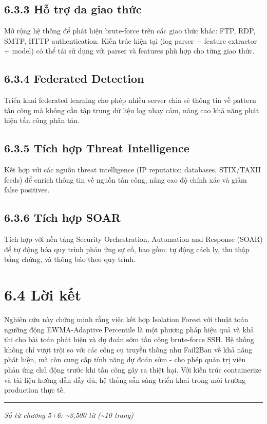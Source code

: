 \documentclass[
  a4paper]{report}
\begin{document}
\subsection{6.3.3 Hỗ trợ đa giao
thức}\label{hux1ed7-trux1ee3-ux111a-giao-thux1ee9c}

Mở rộng hệ thống để phát hiện brute-force trên các giao thức khác: FTP,
RDP, SMTP, HTTP authentication. Kiến trúc hiện tại (log parser + feature
extractor + model) có thể tái sử dụng với parser và features phù hợp cho
từng giao thức.

\subsection{6.3.4 Federated Detection}\label{federated-detection}

Triển khai federated learning cho phép nhiều server chia sẻ thông tin về
pattern tấn công mà không cần tập trung dữ liệu log nhạy cảm, nâng cao
khả năng phát hiện tấn công phân tán.

\subsection{6.3.5 Tích hợp Threat
Intelligence}\label{tuxedch-hux1ee3p-threat-intelligence}

Kết hợp với các nguồn threat intelligence (IP reputation databases,
STIX/TAXII feeds) để enrich thông tin về nguồn tấn công, nâng cao độ
chính xác và giảm false positives.

\subsection{6.3.6 Tích hợp SOAR}\label{tuxedch-hux1ee3p-soar}

Tích hợp với nền tảng Security Orchestration, Automation and Response
(SOAR) để tự động hóa quy trình phản ứng sự cố, bao gồm: tự động cách
ly, thu thập bằng chứng, và thông báo theo quy trình.

\section{6.4 Lời kết}\label{lux1eddi-kux1ebft}

Nghiên cứu này chứng minh rằng việc kết hợp Isolation Forest với thuật
toán ngưỡng động EWMA-Adaptive Percentile là một phương pháp hiệu quả và
khả thi cho bài toán phát hiện và dự đoán sớm tấn công brute-force SSH.
Hệ thống không chỉ vượt trội so với các công cụ truyền thống như
Fail2Ban về khả năng phát hiện, mà còn cung cấp tính năng dự đoán sớm -
cho phép quản trị viên phản ứng chủ động trước khi tấn công gây ra thiệt
hại. Với kiến trúc containerize và tài liệu hướng dẫn đầy đủ, hệ thống
sẵn sàng triển khai trong môi trường production thực tế.

\begin{center}\rule{0.5\linewidth}{0.5pt}\end{center}

\emph{Số từ chương 5+6: \textasciitilde3,500 từ (\textasciitilde10
trang)}
\end{document}
